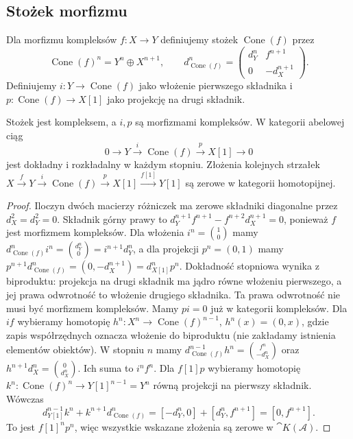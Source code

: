 \subsection{Stożek morfizmu}
\begin{definicja}\label{cat:def:mapping-cone}
Dla morfizmu kompleksów $f:X\to Y$ definiujemy stożek $\operatorname{Cone}(f)$ przez
\[
 \operatorname{Cone}(f)^n=Y^n\oplus X^{n+1},\qquad
 d_{\operatorname{Cone}(f)}^n=
 \begin{pmatrix}d_Y^n&f^{n+1}\\0&-d_X^{n+1}\end{pmatrix}.
\]
Definiujemy $i:Y\to\operatorname{Cone}(f)$ jako włożenie pierwszego składnika i $p:\operatorname{Cone}(f)\to X[1]$ jako projekcję na drugi składnik.
\end{definicja}
\begin{stwierdzenie}\label{cat:prop:cone-complex}
Stożek jest kompleksem, a $i,p$ są morfizmami kompleksów. W kategorii abelowej ciąg
\begin{equation}\label{cat:eq:cone-ses}
 0\to Y\xrightarrow{i}\operatorname{Cone}(f)\xrightarrow{p}X[1]\to0
\end{equation}
jest dokładny i rozkładalny w każdym stopniu. Złożenia kolejnych strzałek $X\xrightarrow f Y\xrightarrow i\operatorname{Cone}(f)\xrightarrow p X[1]\xrightarrow{f[1]}Y[1]$ są zerowe w kategorii homotopijnej.
\end{stwierdzenie}
\begin{proof}
Iloczyn dwóch macierzy różniczek ma zerowe składniki diagonalne przez $d_X^2=d_Y^2=0$. Składnik górny prawy to $d_Y^{n+1}f^{n+1}-f^{n+2}d_X^{n+1}=0$, ponieważ $f$ jest morfizmem kompleksów. Dla włożenia $i^n=\binom{1}{0}$ mamy $d_{\operatorname{Cone}(f)}^ni^n=\binom{d_Y^n}{0}=i^{n+1}d_Y^n$, a dla projekcji $p^n=(0,1)$ mamy $p^{n+1}d_{\operatorname{Cone}(f)}^n=(0,-d_X^{n+1})=d_{X[1]}^np^n$. Dokładność stopniowa wynika z biproduktu: projekcja na drugi składnik ma jądro równe włożeniu pierwszego, a jej prawa odwrotność to włożenie drugiego składnika. Ta prawa odwrotność nie musi być morfizmem kompleksów. Mamy $pi=0$ już w kategorii kompleksów. Dla $if$ wybieramy homotopię $h^n:X^n\to\operatorname{Cone}(f)^{n-1}$, $h^n(x)=(0,x)$, gdzie zapis współrzędnych oznacza włożenie do biproduktu (nie zakładamy istnienia elementów obiektów). W stopniu $n$ mamy $d_{\operatorname{Cone}(f)}^{n-1}h^n=\binom{f^n}{-d_X^n}$ oraz $h^{n+1}d_X^n=\binom{0}{d_X^n}$. Ich suma to $i^nf^n$. Dla $f[1]p$ wybieramy homotopię $k^n:\operatorname{Cone}(f)^n\to Y[1]^{n-1}=Y^n$ równą projekcji na pierwszy składnik. Wówczas
\[
 d_{Y[1]}^{n-1}k^n+k^{n+1}d_{\operatorname{Cone}(f)}^n
 =[-d_Y^n,0]+[d_Y^n,f^{n+1}]=[0,f^{n+1}].
\]
To jest $f[1]^np^n$, więc wszystkie wskazane złożenia są zerowe w $\cat K(\mathcal A)$.
\end{proof}
